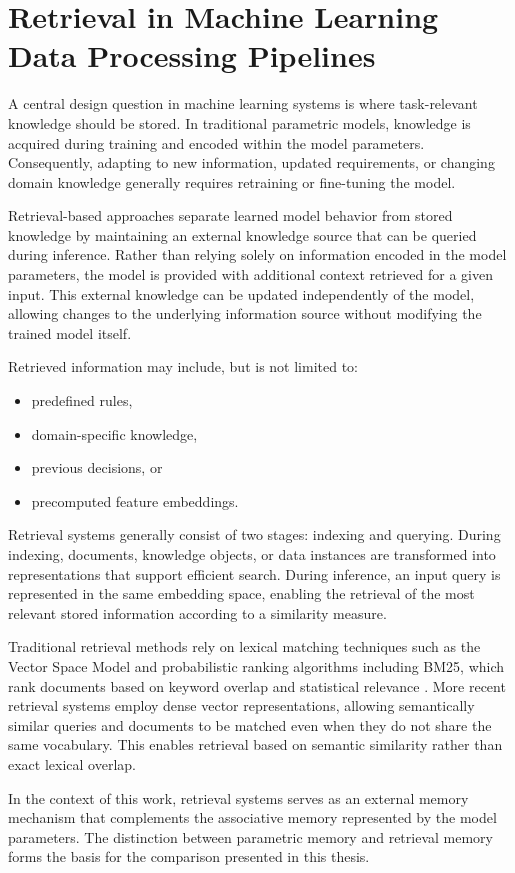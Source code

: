 \section{Retrieval in Machine Learning Data Processing Pipelines}

A central design question in machine learning systems is where task-relevant knowledge should be stored. In traditional parametric models, knowledge is acquired during training and encoded within the model parameters. Consequently, adapting to new information, updated requirements, or changing domain knowledge generally requires retraining or fine-tuning the model.

Retrieval-based approaches separate learned model behavior from stored knowledge by maintaining an external knowledge source that can be queried during inference. Rather than relying solely on information encoded in the model parameters, the model is provided with additional context retrieved for a given input. This external knowledge can be updated independently of the model, allowing changes to the underlying information source without modifying the trained model itself.

Retrieved information may include, but is not limited to:
\begin{itemize}[noitemsep]
    \item predefined rules,
    \item domain-specific knowledge,
    \item previous decisions, or
    \item precomputed feature embeddings.
\end{itemize}

Retrieval systems generally consist of two stages: indexing and querying. During indexing, documents, knowledge objects, or data instances are transformed into representations that support efficient search. During inference, an input query is represented in the same embedding space, enabling the retrieval of the most relevant stored information according to a similarity measure.

Traditional retrieval methods rely on lexical matching techniques such as the Vector Space Model and probabilistic ranking algorithms including BM25, which rank documents based on keyword overlap and statistical relevance \cite{salton1983introduction,robertson2009probabilistic}. More recent retrieval systems employ dense vector representations, allowing semantically similar queries and documents to be matched even when they do not share the same vocabulary. This enables retrieval based on semantic similarity rather than exact lexical overlap.

In the context of this work, retrieval systems serves as an external memory mechanism that complements the associative memory represented by the model parameters. The distinction between parametric memory and retrieval memory forms the basis for the comparison presented in this thesis.